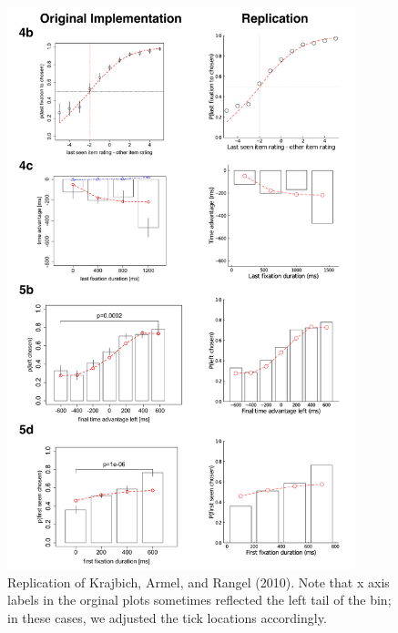 \begin{figure}[tb!]
  \centering
  \includegraphics[width=0.9\textwidth]{figs/attention/supp-addm-replication-binary.pdf}
  \caption{Replication of Krajbich, Armel, and Rangel (2010). Note that x axis labels in the orginal plots sometimes reflected the left tail of the bin; in these cases, we adjusted the tick locations accordingly.
  }
  \label{fig:attention-addm2}
\end{figure}

